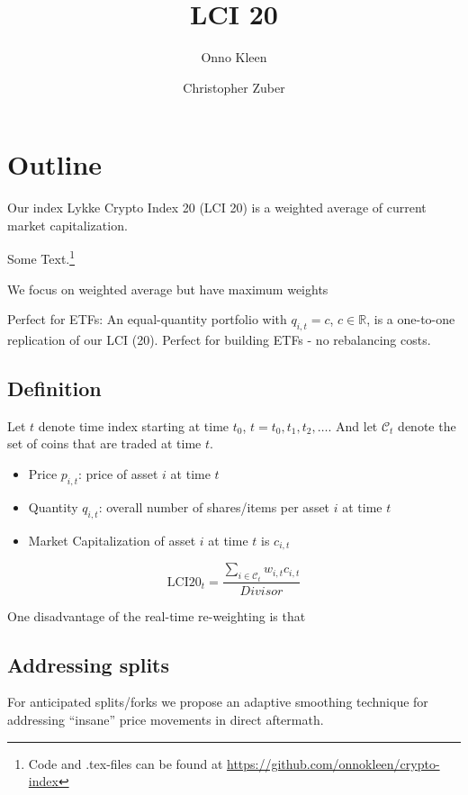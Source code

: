 \documentclass[11pt]{article}
\title{LCI 20}
\author{Onno Kleen \and Christopher Zuber}
\begin{document}
\maketitle
\section{Outline}

Our index Lykke Crypto Index 20 (LCI 20) is a weighted average of current market capitalization.

Some Text.\footnote{Code and .tex-files can be found at \href{https://github.com/onnokleen/crypto-index}{https://github.com/onnokleen/crypto-index}}

We focus on weighted average but have maximum weights

\cite{Trimborn2016}

Perfect for ETFs: An equal-quantity portfolio with $q_{i,t} = c$, $c \in \mathbb{R}$, is a one-to-one replication of our LCI (20). Perfect for building ETFs - no rebalancing costs.

\subsection{Definition}

Let $t$ denote time index starting at time $t_0$, $t = t_0, t_1, t_2, \dots$. And let $\mathcal{C}_t$ denote the set of coins that are traded at time $t$.

\begin{itemize}
  \item Price $p_{i,t}$: price of asset $i$ at time $t$
  \item Quantity $q_{i,t}$: overall number of shares/items per asset $i$ at time $t$
  \item Market Capitalization of asset $i$ at time $t$ is $c_{i,t}$
\end{itemize}

$$ \text{LCI20}_t = \frac{\sum_{i \in \mathcal{C}_{t}} w_{i,t} c_{i,t}}{Divisor} $$

One disadvantage of the real-time re-weighting is that

\subsection{Addressing splits}\label{subseq:split_smoothing}
For anticipated splits/forks we propose an adaptive smoothing technique for addressing ``insane'' price movements in direct aftermath.
\end{document}
